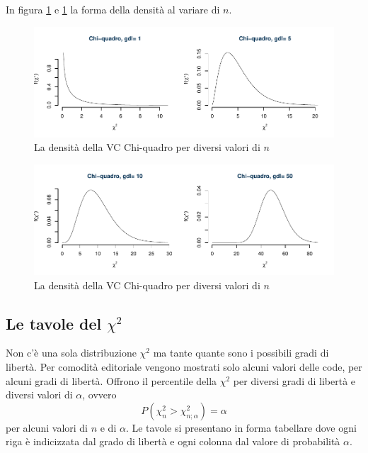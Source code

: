 \documentclass[
  11pt,
]{book}
\theoremstyle{mytheoremstyle}
\theoremstyle{mydefstyle}
\begin{document}
In figura \ref{fig:chi-quadro1} e \ref{fig:chi-quadro1} la forma della densità al variare di \(n\).

\begin{figure}[H]

{\centering \includegraphics{Appunti_di_Statistica_2025_files/figure-latex/chi-quadro1-1} 

}

\caption{La densità della VC Chi-quadro per diversi valori di $n$}\label{fig:chi-quadro1}
\end{figure}
\begin{figure}[H]

{\centering \includegraphics{Appunti_di_Statistica_2025_files/figure-latex/chi-quadro2-1} 

}

\caption{La densità della VC Chi-quadro per diversi valori di $n$}\label{fig:chi-quadro2}
\end{figure}

\subsection{\texorpdfstring{Le tavole del \(\chi^2\)}{Le tavole del \textbackslash chi\^{}2}}\label{le-tavole-del-chi2}

Non c'è una sola distribuzione \(\chi^2\) ma tante quante sono i possibili gradi di libertà.
Per comodità editoriale vengono mostrati solo alcuni valori delle code, per alcuni gradi di libertà.
Offrono il percentile della \(\chi^2\) per diversi gradi di libertà e diversi valori di
\(\alpha\), ovvero
\[P(\chi^2_n>\chi^2_{n;\alpha})=\alpha\]
per alcuni valori di \(n\) e di \(\alpha\).
Le tavole si presentano in forma tabellare dove ogni riga è indicizzata dal grado di libertà e ogni colonna dal valore di probabilità \(\alpha\).
\end{document}
